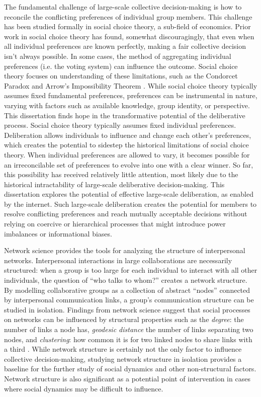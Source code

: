 The fundamental challenge of large-scale collective decision-making is how to
reconcile the conflicting preferences of individual group members.
This challenge has been studied formally in social choice theory,
a sub-field of economics.
Prior work in social choice theory has found, somewhat discouragingly,
that even when all individual preferences are known perfectly,
making a fair collective decision isn't always possible.
In some cases, the method of aggregating individual preferences
(i.e. the voting system) can influence the outcome.
Social choice theory focuses on understanding of these limitations,
such as the Condorcet Paradox
\cite{condorcet_essay_1785} and
Arrow's Impossibility Theorem \cite{arrow_social_2012}.
While social choice theory typically assumes fixed fundamental preferences,
preferences can be instrumental in nature,
varying with factors such as available knowledge, group identity, or perspective.
This dissertation finds hope in the transformative potential of the
deliberative process.
Social choice theory typically assumes fixed individual preferences.
Deliberation allows individuals to influence and change each other's
preferences,
which creates the potential to sidestep the historical limitations of
social choice theory.
When individual preferences are allowed to vary, it becomes possible for an
irreconcilable set of preferences to evolve into one with a clear winner.
So far, this possibility has received relatively little attention,
most likely due to the historical intractability of large-scale deliberative
decision-making.
This dissertation explores the potential of effective large-scale deliberation, as enabled by the internet.
Such large-scale deliberation creates the potential for members to
resolve conflicting preferences and reach mutually acceptable decisions
without relying on coercive or hierarchical processes that might introduce
power imbalances or informational biases.

Network science provides the tools for analyzing the structure of interpersonal
networks.
Interpersonal interactions in large collaborations are necessarily structured:
when a group is too large for each individual to interact with all other individuals,
the question of ``who talks to whom?'' creates a network structure.
By modelling collaborative groups as a collection of abstract ``nodes''
connected by interpersonal communication links,
a group's communication structure can be studied in isolation.
Findings from network science suggest that social processes on networks can be
influenced by structural properties such as
the {\em degree}: the number of links a node has,
{\em geodesic distance} the number of links separating two nodes,
and {\em clustering}: how common it is for two linked nodes to share links with
a third \cite{boccaletti_complex_2006}.
While network structure is certainly not the only factor to influence collective
decision-making,
studying network structure in isolation provides a baseline for the
further study of social dynamics and other non-structural factors.
Network structure is also significant as a potential point of intervention in
cases where social dynamics may be difficult to influence.

